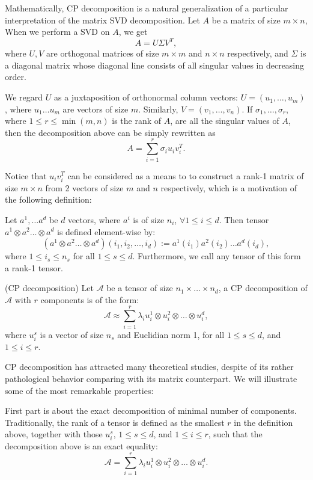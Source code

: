 \documentclass[12pt]{article}
\begin{document}
Mathematically, CP decomposition is a natural generalization of a particular interpretation of the matrix SVD decomposition. Let $A$ be a matrix of size $m \times n$, When we perform a SVD on $A$, we get
$$ A = U \Sigma V^T, $$
where $U, V$ are orthogonal matrices of size $m \times m$ and $n \times n$ respectively, and $\Sigma$ is a diagonal matrix whose diagonal line consists of all singular values in decreasing order. 

We regard $U$ as a juxtaposition of orthonormal column vectors: $U = (u_1, \dots, u_m)$, where $u_1 \dots u_m$ are vectors of size $m$. Similarly, $V = (v_1, \dots, v_n)$. If $\sigma_1, \dots, \sigma_r $, where $1 \leq r \leq \min(m, n)$ is the rank of $A$, are all the singular values of $A$, then the decomposition above can be simply rewritten as
$$ A = \sum_{i = 1}^r \sigma_i u_i v_i^T.$$

Notice that $u_iv_i^T$ can be considered as a means to to construct a rank-1 matrix of size $m \times n$ from 2 vectors of size $m$ and $n$ respectively, which is a motivation of the following definition:

\begin{mydef}
Let $a^1, \dots a^d$ be $d$ vectors, where $a^i$ is of size $n_i$, $\forall 1 \leq i \leq d$. Then tensor $a^1 \otimes a^2 \dots \otimes a^d$ is defined element-wise by:
$$ (a^1 \otimes a^2 \dots \otimes a^d)(i_1, i_2, \dots, i_d) := a^1(i_1) a^2(i_2) \dots a^d(i_d),$$
where $1 \leq i_s \leq n_s$ for all $1 \leq s \leq d$. Furthermore, we call any tensor of this form a rank-1 tensor.
\end{mydef}

\begin{mydef}{(CP decomposition)}
\label{defcp}
Let $\mathcal{A}$ be a tensor of size $n_1 \times \dots \times n_d$, a CP decomposition of $\mathcal{A}$ with $r$ components is of the form:
$$ \mathcal{A} \approx \sum_{i = 1}^r \lambda_i u_i^1 \otimes u_i^2 \otimes \dots \otimes u_i^d,$$
where $u_i^s$ is a vector of size $n_s$ and Euclidian norm 1, for all $1 \leq s \leq d$, and $1 \leq i \leq r$.
\end{mydef}

CP decomposition has attracted many theoretical studies, despite of its rather pathological behavior comparing with its matrix counterpart. We will illustrate some of the most remarkable properties:

First part is about the exact decomposition of minimal number of components. Traditionally, the rank of a tensor is defined as the smallest $r$ in the definition above, together with those $u_i^s$, $1 \leq s \leq d$, and $1 \leq i \leq r$, such that the decomposition above is an exact equality:
$$ \mathcal{A} = \sum_{i = 1}^r \lambda_i u_i^1 \otimes u_i^2 \otimes \dots \otimes u_i^d.$$
\end{document}
